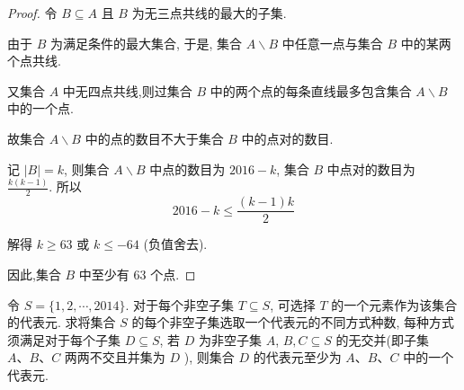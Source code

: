 \begin{proof}
	令 $B \subseteq A$ 且 $B$ 为无三点共线的最大的子集.

	由于 $B$ 为满足条件的最大集合, 于是, 集合 $A \backslash B$ 中任意一点与集合 $B$ 中的某两个点共线.

	又集合 $A$ 中无四点共线,则过集合 $B$ 中的两个点的每条直线最多包含集合 $A \backslash B$ 中的一个点.

	故集合 $A \backslash B$ 中的点的数目不大于集合 $B$ 中的点对的数目.

	记 $|B|=k$, 则集合 $A \backslash B$ 中点的数目为 $2016-k$, 集合 $B$ 中点对的数目为 $\frac{k(k-1)}{2}$. 所以
	$$
		2016-k \leqslant \frac{(k-1) k}{2}
	$$

	解得 $k \geqslant 63$ 或 $k \leqslant-64$ (负值舍去).

	因此,集合 $B$ 中至少有 63 个点.
\end{proof}

\begin{example}
	令 $S=\{1,2, \cdots, 2014\}$. 对于每个非空子集 $T \subseteq S$, 可选择 $T$ 的一个元素作为该集合的代表元. 求将集合 $S$ 的每个非空子集选取一个代表元的不同方式种数, 每种方式须满足对于每个子集 $D \subseteq S$, 若 $D$ 为非空子集 $A$, $B, C \subseteq S$ 的无交并(即子集 $A 、 B 、 C$ 两两不交且并集为 $D$ ), 则集合 $D$ 的代表元至少为 $A 、 B 、 C$ 中的一个代表元.
\end{example}

